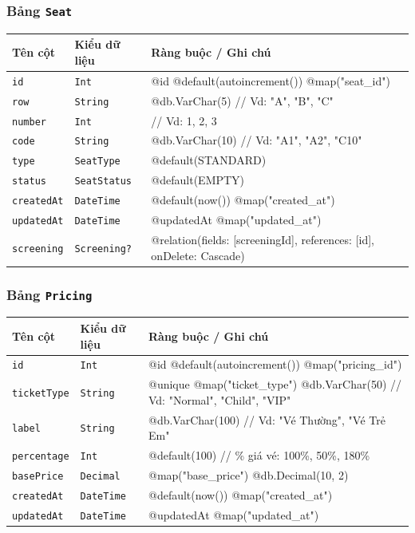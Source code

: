 \subsubsection{Bảng \texttt{Seat}}
\begin{longtable}{|p{3.6cm}|p{3.0cm}|p{8.9cm}|}
\hline
\rowcolor{headerblue} \textbf{Tên cột} & \textbf{Kiểu dữ liệu} & \textbf{Ràng buộc / Ghi chú} \\ \hline
\endhead
\texttt{id} & \texttt{Int} & \small @id @default(autoincrement()) @map("seat\_id") \\ \hline
\texttt{row} & \texttt{String} & \small @db.VarChar(5) // Vd: "A", "B", "C" \\ \hline
\texttt{number} & \texttt{Int} & \small // Vd: 1, 2, 3 \\ \hline
\texttt{code} & \texttt{String} & \small @db.VarChar(10) // Vd: "A1", "A2", "C10" \\ \hline
\texttt{type} & \texttt{SeatType} & \small @default(STANDARD) \\ \hline
\texttt{status} & \texttt{SeatStatus} & \small @default(EMPTY) \\ \hline
\texttt{createdAt} & \texttt{DateTime} & \small @default(now()) @map("created\_at") \\ \hline
\texttt{updatedAt} & \texttt{DateTime} & \small @updatedAt @map("updated\_at") \\ \hline
\texttt{screening} & \texttt{Screening?} & \small @relation(fields: [screeningId], references: [id], onDelete: Cascade) \\ \hline
\end{longtable}

\subsubsection{Bảng \texttt{Pricing}}
\begin{longtable}{|p{3.6cm}|p{3.0cm}|p{8.9cm}|}
\hline
\rowcolor{headerblue} \textbf{Tên cột} & \textbf{Kiểu dữ liệu} & \textbf{Ràng buộc / Ghi chú} \\ \hline
\endhead
\texttt{id} & \texttt{Int} & \small @id @default(autoincrement()) @map("pricing\_id") \\ \hline
\texttt{ticketType} & \texttt{String} & \small @unique @map("ticket\_type") @db.VarChar(50) // Vd: "Normal", "Child", "VIP" \\ \hline
\texttt{label} & \texttt{String} & \small @db.VarChar(100) // Vd: "Vé Thường", "Vé Trẻ Em" \\ \hline
\texttt{percentage} & \texttt{Int} & \small @default(100) // \% giá vé: 100\%, 50\%, 180\% \\ \hline
\texttt{basePrice} & \texttt{Decimal} & \small @map("base\_price") @db.Decimal(10, 2) \\ \hline
\texttt{createdAt} & \texttt{DateTime} & \small @default(now()) @map("created\_at") \\ \hline
\texttt{updatedAt} & \texttt{DateTime} & \small @updatedAt @map("updated\_at") \\ \hline
\end{longtable}

